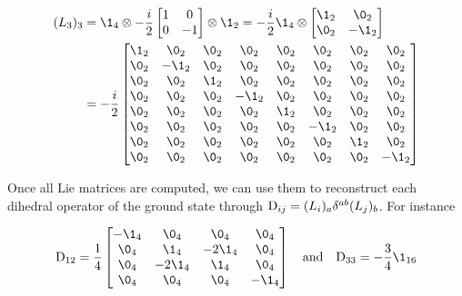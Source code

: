 \begin{align*}
    (L_3)_3&=\1_4\otimes-\frac{i}{2}\begin{bmatrix}
        1&0\\
        0&-1
    \end{bmatrix}\otimes\1_2=-\frac{i}{2}\1_4\otimes\begin{bmatrix}
        \1_2&\0_2\\
        \0_2&-\1_2
    \end{bmatrix}\\
    &=-\frac{i}{2}\begin{bmatrix}
        \1_2&\0_2&\0_2&\0_2&\0_2&\0_2&\0_2&\0_2\\
        \0_2&-\1_2&\0_2&\0_2&\0_2&\0_2&\0_2&\0_2\\
        \0_2&\0_2&\1_2&\0_2&\0_2&\0_2&\0_2&\0_2\\
        \0_2&\0_2&\0_2&-\1_2&\0_2&\0_2&\0_2&\0_2\\
        \0_2&\0_2&\0_2&\0_2&\1_2&\0_2&\0_2&\0_2\\
        \0_2&\0_2&\0_2&\0_2&\0_2&-\1_2&\0_2&\0_2\\
        \0_2&\0_2&\0_2&\0_2&\0_2&\0_2&\1_2&\0_2\\
        \0_2&\0_2&\0_2&\0_2&\0_2&\0_2&\0_2&-\1_2\\
    \end{bmatrix}
\end{align*}

Once all Lie matrices are computed, we can use them to reconstruct each dihedral operator of the ground state through $\text{\normalfont D}_{ij}=(L_i)_a\delta^{ab}(L_j)_b$. For instance

$$\Dd_{12}=\frac{1}{4}\begin{bmatrix}
    -\1_4&\0_4&\0_4&\0_4\\
    \0_4&\1_4&-2\1_4&\0_4\\
    \0_4&-2\1_4&\1_4&\0_4\\
    \0_4&\0_4&\0_4&-\1_4
\end{bmatrix}\quad\text{and}\quad\Dd_{33}=-\frac{3}{4}\1_{16}$$


